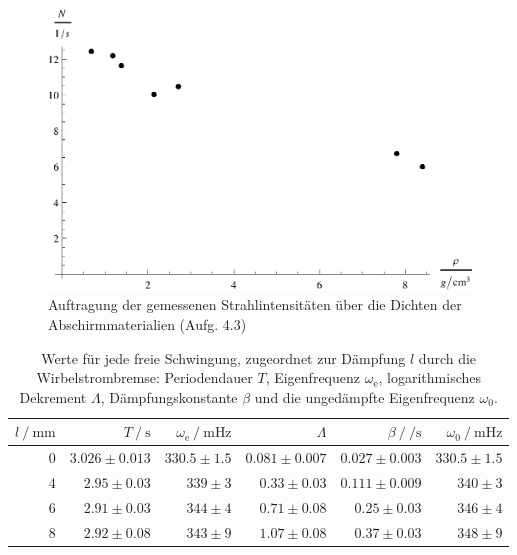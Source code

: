 \begin{figure}[p]
\centering
\includegraphics[scale=1.0]{fig/iii_4p3.eps}
\caption{Auftragung der gemessenen Strahlintensitäten über die Dichten der Abschirmmaterialien (Aufg. 4.3)}
\label{fig:iii_4p3}
\end{figure}

\begin{table}[ht]
	\begin{center}
		\caption{Werte für jede freie Schwingung, zugeordnet zur Dämpfung $l$ durch die Wirbelstrombremse:
		Periodendauer $T$, Eigenfrequenz $\omega_\text{e}$, logarithmisches Dekrement $\Lambda$, Dämpfungskonstante $\beta$ und
		die ungedämpfte Eigenfrequenz $\omega_0$.}
		\begin{tabular}{rrrrrr}
			\toprule
			$l ~/~ \si{\milli\meter}$ & $T ~/~ \si\second$ & $\omega_{\mathrm{e}} ~/~ \si{\milli\Hz}$ & $\Lambda$ & $\beta ~/~ \si{\per\s}$ & $\omega_0 ~/~ \si{\milli\Hz}$\\
			\midrule
			$\num{0}$ & $\num{3.026} \pm \num{0.013}$ & $\num{330.5} \pm \num{1.5}$ & $\num{0.081} \pm \num{0.007}$ & $\num{0.027} \pm \num{0.003}$ & $\num{330.5} \pm \num{1.5}$\\
			$\num{4}$ & $\num{2.95} \pm \num{0.03}$   & $\num{339} \pm \num{3}$     & $\num{0.33} \pm \num{0.03}$   & $\num{0.111} \pm \num{0.009}$ & $\num{340} \pm \num{3}$\\
			$\num{6}$ & $\num{2.91} \pm \num{0.03}$   & $\num{344} \pm \num{4}$     & $\num{0.71} \pm \num{0.08}$   & $\num{0.25} \pm \num{0.03}$   & $\num{346} \pm \num{4}$\\
			$\num{8}$ & $\num{2.92} \pm \num{0.08}$   & $\num{343} \pm \num{9}$     & $\num{1.07} \pm \num{0.08}$   & $\num{0.37} \pm \num{0.03}$   & $\num{348} \pm \num{9}$\\
			\bottomrule
		\end{tabular}
		\label{tab:frei}
	\end{center}
\end{table}